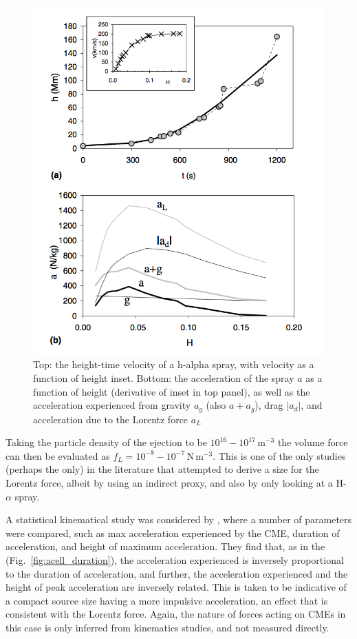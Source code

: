 \begin{figure}[ts!]
\begin{center}
\includegraphics[scale=0.35, trim=0cm 0cm 0cm 2cm]{images/vrsnak_lorentz}
\caption[Acceleration due to all forces acting on CME]{Top: the height-time velocity of a h-alpha spray, with velocity as a function of height inset. Bottom: the acceleration of the spray $a$ as a function of height (derivative of inset in top panel), as well as the acceleration experienced from gravity $a_g$ (also $a+a_g$), drag $|a_d|$, and acceleration due to the Lorentz force $a_L$ \citep{vrs06}}
\label{fig:vrsnak06}
\end{center}
\end{figure}
Taking the particle density of the ejection to be $10^{16}-10^{17}$\,m$^{-3}$ the volume force can then be evaluated as $f_L = 10^{-8}-10^{-7}$\,N\,m$^{-3}$. This is one of the only studies (perhaps the only) in the literature that attempted to derive a size for the Lorentz force, albeit by using an indirect proxy, and also by only looking at a H-$\alpha$ spray.


A statistical kinematical study was considered by \citep{bein2011}, where a number of parameters were compared, such as max acceleration experienced by the CME, duration of acceleration, and height of maximum acceleration. They find that, as in the \citet{zhang2006} (Fig.~\ref{fig:acell_duration}), the acceleration experienced is inversely proportional to the duration of acceleration, and further, the acceleration experienced and the height of peak acceleration are inversely related. This is taken to be indicative of a compact source size having a more impulsive acceleration, an effect that is consistent with the Lorentz force. Again, the nature of forces acting on CMEs in this case is only inferred from kinematics studies, and not measured directly.

